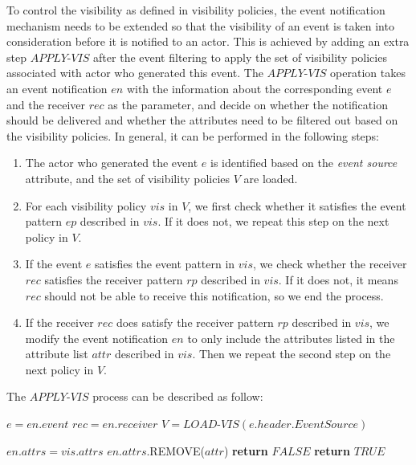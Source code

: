To control the visibility as defined in visibility policies, the event notification mechanism needs to be extended so that the visibility of an event is taken into consideration before it is notified to an actor. This is achieved by adding an extra step $APPLY\textrm{-}VIS$ after the event filtering to apply the set of visibility policies associated with actor who generated this event. The $APPLY\textrm{-}VIS$ operation takes an event notification $en$ with the information about the corresponding event $e$ and the receiver $rec$ as the parameter, and decide on whether the notification should be delivered and whether the attributes need to be filtered out based on the visibility policies. In general, it can be performed in the following steps:

\begin{enumerate}
	\item The actor who generated the event $e$ is identified based on the \emph{event source} attribute, and the set of visibility policies $V$ are loaded. 
	\item For each visibility policy $vis$ in $V$, we first check whether it satisfies the event pattern $ep$ described in $vis$. If it does not, we repeat this step on the next policy in $V$.
	\item If the event $e$ satisfies the event pattern in $vis$, we check whether the receiver $rec$ satisfies the receiver pattern $rp$ described in $vis$. If it does not, it means $rec$ should not be able to receive this notification, so we end the process.
	\item If the receiver $rec$ does satisfy the receiver pattern $rp$ described in $vis$, we modify the event notification $en$ to only include the attributes listed in the attribute list $attr$ described in $vis$. Then we repeat the second step on the next policy in $V$.
\end{enumerate}

The $APPLY\textrm{-}VIS$ process can be described as follow:

{\footnotesize
\begin{algorithm}
\begin{algorithmic}[1]
	\State $e = en.event$
	\State $rec = en.receiver$
	\State $V = LOAD\textrm{-}VIS(e.header.EventSource)$
	
					\State $en.attrs = vis.attrs$
				\Else
				    		\State $en.attrs$.REMOVE($attr$)
				    	\EndIf	
				    \EndFor	
				\EndIf
			\Else	
				\State \textbf{return} $FALSE$ 
			\EndIf
		\EndIf
	\EndFor
	\State \textbf{return} $TRUE$ 
\EndProcedure
\end{algorithmic}
\end{algorithm}
}


